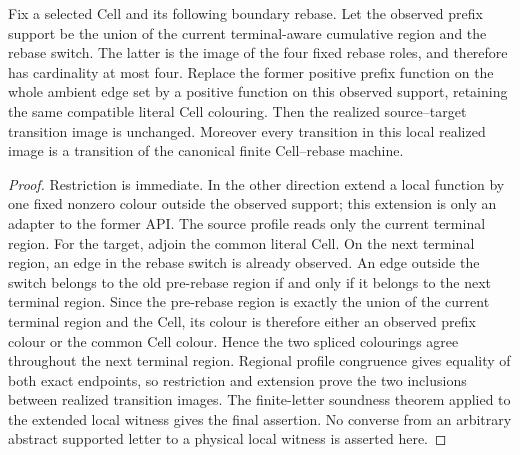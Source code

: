 \begin{proposition}
\label{prop:selected-cell-rebase-witness-local}
Fix a selected Cell and its following boundary rebase.  Let the observed
prefix support be the union of the current terminal-aware cumulative region
and the rebase switch.  The latter is the image of the four fixed rebase
roles, and therefore has cardinality at most four.
Replace the former positive prefix function on the whole ambient edge set by
a positive function on this observed support, retaining the same compatible
literal Cell colouring.  Then the realized source--target transition image is
unchanged.  Moreover every transition in this local realized image is a
transition of the canonical finite Cell--rebase machine.
\end{proposition}

\begin{proof}
Restriction is immediate.  In the other direction extend a local function by
one fixed nonzero colour outside the observed support; this extension is only
an adapter to the former API.  The source profile reads only the current
terminal region.  For the target, adjoin the common literal Cell.  On the
next terminal region, an edge in the rebase switch is already observed.  An
edge outside the switch belongs to the old pre-rebase region if and only if it
belongs to the next terminal region.  Since the pre-rebase region is exactly
the union of the current terminal region and the Cell, its colour is therefore
either an observed prefix colour or the common Cell colour.  Hence the two
spliced colourings agree throughout the next terminal region.  Regional
profile congruence gives equality of both exact endpoints, so restriction and
extension prove the two inclusions between realized transition images.  The
finite-letter soundness theorem applied to the extended local witness gives
the final assertion.  No converse from an arbitrary abstract supported letter
to a physical local witness is asserted here.
\end{proof}

